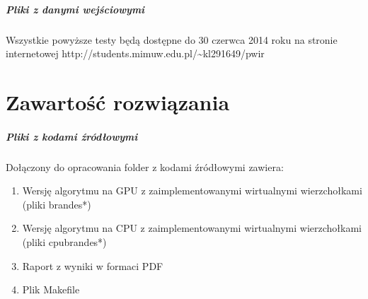 \documentclass[oneside]{book}
\begin{document}
\paragraph{Pliki z danymi wejściowymi}	Wszystkie powyższe testy będą dostępne do 30 czerwca 2014 roku na stronie internetowej  http://students.mimuw.edu.pl/\textasciitilde kl291649/pwir 

\chapter{Zawartość rozwiązania}
\paragraph{Pliki z kodami źródłowymi} Dołączony do opracowania folder z kodami źródłowymi zawiera:
\begin{enumerate}
\item Wersję algorytmu na GPU z zaimplementowanymi wirtualnymi wierzchołkami (pliki brandes*)
\item Wersję algorytmu na CPU z zaimplementowanymi wirtualnymi wierzchołkami (pliki cpubrandes*)
\item Raport z wyniki w formaci PDF
\item Plik Makefile
\end{enumerate}
\end{document}
